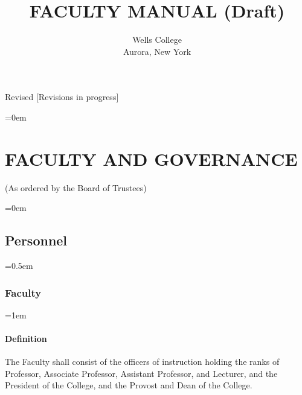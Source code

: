 \documentclass{manual}
\let\stdsection\section %
\renewcommand\section{\newpage\stdsection}
\let\oldsection\section
\renewcommand\section{\leftskip=0em\oldsection}
\let\oldsubsection\subsection
\renewcommand\subsection{\leftskip=0em\oldsubsection}
\let\oldsubsubsection\subsubsection
\renewcommand\subsubsection{\leftskip=0.5em\oldsubsubsection}
\let\oldparagraph\paragraph
\renewcommand\paragraph{\leftskip=1em\oldparagraph}
\begin{document}
\title{FACULTY MANUAL (Draft)}
\author{Wells College\\Aurora, New York}

\maketitle
  \vfill
  \begin{center}
  Revised [Revisions in progress]
  \end{center}

\newpage

\pagestyle{fancy}
\fancyhead[R]{\thepage \addtocounter{articlePage}{1}}

\tableofcontents
\newpage

\fancyfoot[C]{\thesection-\thearticlePage}

\section{FACULTY AND GOVERNANCE}\label{art:FacultyAndGovernance}
\begin{center}(As ordered by the Board of Trustees)\end{center}

\subsection{Personnel}\label{sec:Personnel}

\subsubsection{Faculty}\label{sub:Faculty}

\paragraph{Definition}
The Faculty shall consist of the officers of instruction holding the ranks of Professor, Associate Professor, Assistant Professor, and Lecturer, and the President of the College, and the Provost and Dean of the College.

\end{document}
